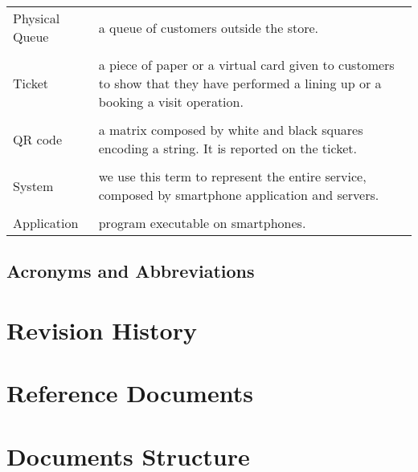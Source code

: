 \begin{tabularx}{\textwidth}{ >{\hsize=0.2\textwidth}X >{\hsize=0.8\textwidth}X}
  Physical Queue & a queue of customers outside the store.\\ \\
  Ticket & a piece of paper or a virtual card given to customers to show that they have performed a lining up or a booking a visit operation.\\ \\
  QR code & a matrix composed by white and black squares encoding a string. It is reported on the ticket.\\ \\
  System & we use this term to represent the entire service, composed by smartphone application and servers.\\ \\
  Application & program executable on smartphones.
\end{tabularx}

\subsection{Acronyms and Abbreviations}
\printglossary

\section{Revision History}

\section{Reference Documents}

\section{Documents Structure}